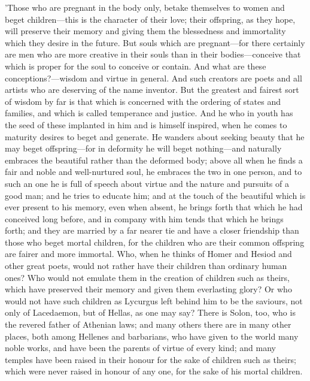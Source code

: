 \para[120] 'Those who are pregnant in the body only, betake themselves to women and beget children---this is the character of their love; their offspring, as they hope, will preserve their memory and giving them the blessedness and immortality which they desire in the future. But souls which are pregnant---for there certainly are men who are more creative in their souls than in their bodies---conceive that which is proper for the soul to conceive or contain. And what are these conceptions?---wisdom and virtue in general. And such creators are poets and all artists who are deserving of the name inventor. But the greatest and fairest sort of wisdom by far is that which is concerned with the ordering of states and families, and which is called temperance and justice. And he who in youth has the seed of these implanted in him and is himself inspired, when he comes to maturity desires to beget and generate. He wanders about seeking beauty that he may beget offspring---for in deformity he will beget nothing---and naturally embraces the beautiful rather than the deformed body; above all when he finds a fair and noble and well-nurtured soul, he embraces the two in one person, and to such an one he is full of speech about virtue and the nature and pursuits of a good man; and he tries to educate him; and at the touch of the beautiful which is ever present to his memory, even when absent, he brings forth that which he had conceived long before, and in company with him tends that which he brings forth; and they are married by a far nearer tie and have a closer friendship than those who beget mortal children, for the children who are their common offspring are fairer and more immortal. Who, when he thinks of Homer and Hesiod and other great poets, would not rather have their children than ordinary human ones? Who would not emulate them in the creation of children such as theirs, which have preserved their memory and given them everlasting glory? Or who would not have such children as Lycurgus left behind him to be the saviours, not only of Lacedaemon, but of Hellas, as one may say? There is Solon, too, who is the revered father of Athenian laws; and many others there are in many other places, both among Hellenes and barbarians, who have given to the world many noble works, and have been the parents of virtue of every kind; and many temples have been raised in their honour for the sake of children such as theirs; which were never raised in honour of any one, for the sake of his mortal children.


